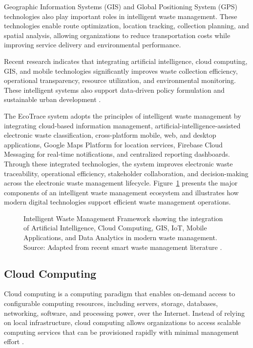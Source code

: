 Geographic Information Systems (GIS) and Global Positioning System (GPS)
technologies also play important roles in intelligent waste management. These
technologies enable route optimization, location tracking, collection planning, and
spatial analysis, allowing organizations to reduce transportation costs while
improving service delivery and environmental performance.

Recent research indicates that integrating artificial intelligence, cloud
computing, GIS, and mobile technologies significantly improves waste collection
efficiency, operational transparency, resource utilization, and environmental
monitoring. These intelligent systems also support data-driven policy formulation
and sustainable urban development \citep{kaza2018,sharma2023}.

The EcoTrace system adopts the principles of intelligent waste management by
integrating cloud-based information management, artificial-intelligence-assisted
electronic waste classification, cross-platform mobile, web, and desktop
applications, Google Maps Platform for location services, Firebase Cloud
Messaging for real-time notifications, and centralized reporting dashboards.
Through these integrated technologies, the system improves electronic waste
traceability, operational efficiency, stakeholder collaboration, and decision-making
across the electronic waste management lifecycle. Figure~\ref{fig:intelligent-waste}
presents the major components of an intelligent waste management ecosystem and
illustrates how modern digital technologies support efficient waste management
operations.

\begin{figure}[H]
  \centering
  \caption{Intelligent Waste Management Framework showing the integration of Artificial Intelligence, Cloud Computing, GIS, IoT, Mobile Applications, and Data Analytics in modern waste management. Source: Adapted from recent smart waste management literature \citep{sharma2023}.}
  \label{fig:intelligent-waste}
\end{figure}

\subsection{Cloud Computing}

Cloud computing is a computing paradigm that enables on-demand access to
configurable computing resources, including servers, storage, databases,
networking, software, and processing power, over the Internet. Instead of relying
on local infrastructure, cloud computing allows organizations to access scalable
computing services that can be provisioned rapidly with minimal management
effort \citep{armbrust2010,mell2011}.

